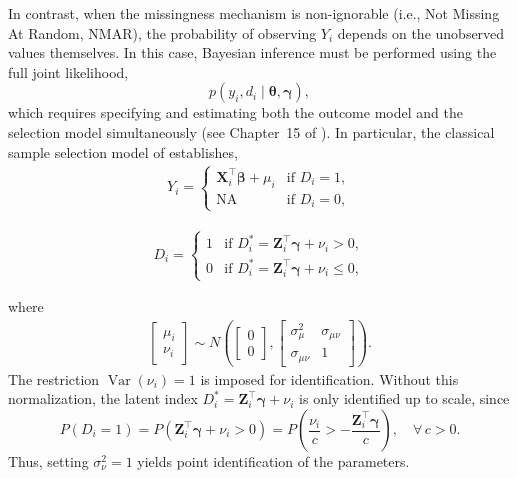 In contrast, when the missingness mechanism is non-ignorable (i.e., Not Missing At Random, NMAR), the probability of observing $Y_i$ depends on the unobserved values themselves. In this case, Bayesian inference must be performed using the full joint likelihood,
\[
p(y_i, d_i \mid \boldsymbol{\theta},\boldsymbol{\gamma}),
\]
which requires specifying and estimating both the outcome model and the selection model simultaneously (see Chapter~15 of \cite{little2019statistical}). In particular, the classical sample selection model of \cite{heckman1979sample} establishes,
\begin{align*}
	Y_i = \begin{cases}
		\mathbf{X}_i^{\top}\boldsymbol{\beta}+\mu_i & \text{if } D_i=1, \\
		\text{NA} & \text{if } D_i=0,
	\end{cases}
\end{align*}

\begin{align*}
	D_i = \begin{cases}
		1 & \text{if } D_i^* = \mathbf{Z}_i^{\top}\boldsymbol{\gamma}+\nu_i > 0, \\
		0 & \text{if } D_i^* = \mathbf{Z}_i^{\top}\boldsymbol{\gamma}+\nu_i \leq 0,
	\end{cases}
\end{align*}

where
\begin{align}
	\begin{bmatrix}
		\mu_i \\[6pt]
		\nu_i
	\end{bmatrix}
	\sim N\!\left(
	\begin{bmatrix}
		0 \\ 0
	\end{bmatrix},
	\begin{bmatrix}
		\sigma^2_{\mu} & \sigma_{\mu\nu} \\
		\sigma_{\mu\nu} & 1
	\end{bmatrix}\right).
\end{align}
The restriction $\operatorname{Var}(\nu_i)=1$ is imposed for identification. 
Without this normalization, the latent index $D_i^*=\mathbf{Z}_i^{\top}\boldsymbol{\gamma}+\nu_i$ is only identified up to scale, since
\[
P(D_i=1) = P(\mathbf{Z}_i^{\top}\boldsymbol{\gamma}+\nu_i > 0) 
= P\!\left(\frac{\nu_i}{c} > -\frac{\mathbf{Z}_i^{\top}\boldsymbol{\gamma}}{c}\right),
\quad \forall\, c>0.
\]
Thus, setting $\sigma^2_{\nu}=1$ yields point identification of the parameters.

